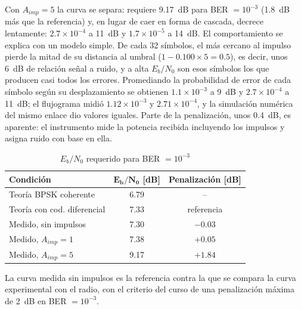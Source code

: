 Con $A_{imp}=5$ la curva se separa: requiere 9.17~dB para BER $=10^{-3}$ (1.8~dB más que la referencia) y, en lugar de caer en forma de cascada, decrece lentamente: $2.7\times10^{-4}$ a 11~dB y $1.7\times10^{-5}$ a 14~dB. El comportamiento se explica con un modelo simple. De cada 32 símbolos, el más cercano al impulso pierde la mitad de su distancia al umbral ($1-0.100\times5=0.5$), es decir, unos 6~dB de relación señal a ruido, y a alta $E_b/N_0$ son esos símbolos los que producen casi todos los errores. Promediando la probabilidad de error de cada símbolo según su desplazamiento se obtienen $1.1\times10^{-3}$ a 9~dB y $2.7\times10^{-4}$ a 11~dB; el flujograma midió $1.12\times10^{-3}$ y $2.71\times10^{-4}$, y la simulación numérica del mismo enlace dio valores iguales. Parte de la penalización, unos 0.4~dB, es aparente: el instrumento mide la potencia recibida incluyendo los impulsos y asigna ruido con base en ella.

\begin{table}[H]
    \centering
    \caption{$E_b/N_0$ requerido para BER $=10^{-3}$}
    \label{tab:ber}
    \footnotesize
    \begin{tabular}{@{}lcc@{}}
        \toprule
        \textbf{Condición} & $\mathbf{E_b/N_0}$ \textbf{[dB]} & \textbf{Penalización [dB]} \\
        \midrule
        Teoría BPSK coherente & 6.79 & -- \\
        Teoría con cod. diferencial & 7.33 & referencia \\
        Medido, sin impulsos & 7.30 & $-0.03$ \\
        Medido, $A_{imp}=1$ & 7.38 & $+0.05$ \\
        Medido, $A_{imp}=5$ & 9.17 & $+1.84$ \\
        \bottomrule
    \end{tabular}
\end{table}


La curva medida sin impulsos es la referencia contra la que se compara la curva experimental con el radio, con el criterio del curso de una penalización máxima de 2~dB en BER $=10^{-3}$.
